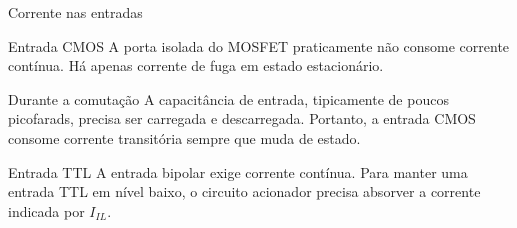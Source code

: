 
\begin{frame}{Corrente nas entradas}
    \begin{block}{Entrada CMOS}
        A porta isolada do MOSFET praticamente não consome corrente contínua.
        Há apenas corrente de fuga em estado estacionário.
    \end{block}

    \begin{block}{Durante a comutação}
        A capacitância de entrada, tipicamente de poucos picofarads, precisa ser
        carregada e descarregada. Portanto, a entrada CMOS consome corrente
        transitória sempre que muda de estado.
    \end{block}

    \begin{alertblock}{Entrada TTL}
        A entrada bipolar exige corrente contínua. Para manter uma entrada TTL
        em nível baixo, o circuito acionador precisa absorver a corrente indicada
        por $I_{IL}$.
    \end{alertblock}
\end{frame}
